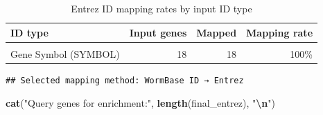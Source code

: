 \documentclass[
  11pt,
]{article}
\newenvironment{Shaded}{\begin{snugshade}}{\end{snugshade}}
\newcommand{\CommentTok}[1]{\textcolor[rgb]{0.56,0.35,0.01}{\textit{#1}}}
\newcommand{\ControlFlowTok}[1]{\textcolor[rgb]{0.13,0.29,0.53}{\textbf{#1}}}
\newcommand{\FunctionTok}[1]{\textcolor[rgb]{0.13,0.29,0.53}{\textbf{#1}}}
\newcommand{\NormalTok}[1]{#1}
\newcommand{\OtherTok}[1]{\textcolor[rgb]{0.56,0.35,0.01}{#1}}
\newcommand{\SpecialCharTok}[1]{\textcolor[rgb]{0.81,0.36,0.00}{\textbf{#1}}}
\newcommand{\StringTok}[1]{\textcolor[rgb]{0.31,0.60,0.02}{#1}}
\begin{document}
\begingroup\fontsize{10}{12}\selectfont

\begin{longtable}[t]{lrrr}
\caption{\label{tab:id-mapping}Entrez ID mapping rates by input ID type}\\
\toprule
ID type & Input genes & Mapped & Mapping rate\\
\midrule
\cellcolor{gray!10}{WormBase (WORMBASE)} & \cellcolor{gray!10}{18} & \cellcolor{gray!10}{18} & \cellcolor{gray!10}{100\%}\\
Gene Symbol (SYMBOL) & 18 & 18 & 100\%\\
\bottomrule
\end{longtable}
\endgroup{}

\begin{Shaded}
\end{Shaded}

\begin{verbatim}
## Selected mapping method: WormBase ID → Entrez
\end{verbatim}

\begin{Shaded}
\begin{Highlighting}[]
\FunctionTok{cat}\NormalTok{(}\StringTok{"Query genes for enrichment:"}\NormalTok{, }\FunctionTok{length}\NormalTok{(final\_entrez), }\StringTok{"}\SpecialCharTok{\textbackslash{}n}\StringTok{"}\NormalTok{)}
\end{Highlighting}
\end{Shaded}
\end{document}
